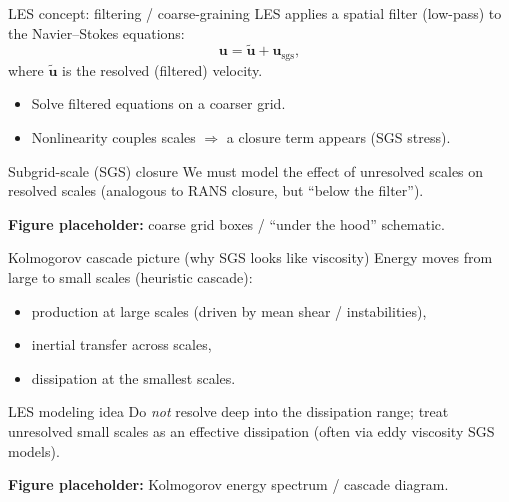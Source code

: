 \documentclass[aspectratio=169]{beamer}
\newcommand{\uu}{\bm{u}}
\begin{document}
\begin{frame}{LES concept: filtering / coarse-graining}
LES applies a spatial filter (low-pass) to the Navier--Stokes equations:
\[
\uu = \tilde{\uu} + \uu_{\mathrm{sgs}},
\]
where $\tilde{\uu}$ is the resolved (filtered) velocity.

\begin{itemize}
  \item Solve filtered equations on a coarser grid.
  \item Nonlinearity couples scales $\Rightarrow$ a closure term appears (SGS stress).
\end{itemize}

\begin{block}{Subgrid-scale (SGS) closure}
We must model the effect of unresolved scales on resolved scales (analogous to RANS closure, but ``below the filter'').
\end{block}

\textbf{Figure placeholder:} coarse grid boxes / ``under the hood'' schematic.
\end{frame}

\begin{frame}{Kolmogorov cascade picture (why SGS looks like viscosity)}
Energy moves from large to small scales (heuristic cascade):
\begin{itemize}
  \item production at large scales (driven by mean shear / instabilities),
  \item inertial transfer across scales,
  \item dissipation at the smallest scales.
\end{itemize}

\begin{block}{LES modeling idea}
Do \emph{not} resolve deep into the dissipation range; treat unresolved small scales as an effective dissipation (often via eddy viscosity SGS models).
\end{block}

\textbf{Figure placeholder:} Kolmogorov energy spectrum / cascade diagram.
\end{frame}
\end{document}
